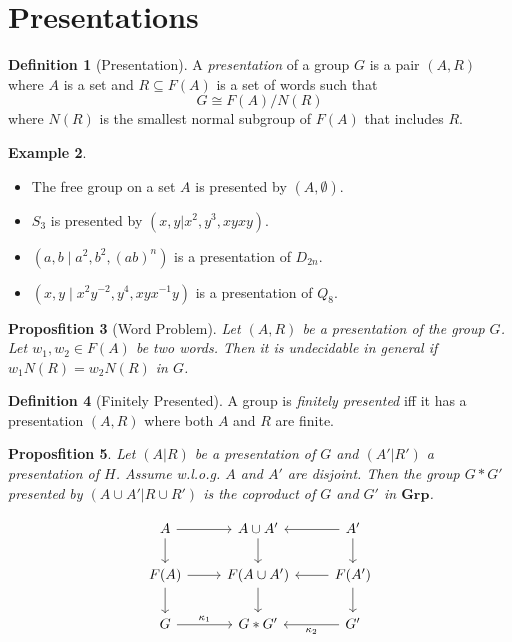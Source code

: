 \documentclass{book}
\newtheorem{prop}{Proposfition}[chapter]
\theoremstyle{definition}
\newtheorem{df}[prop]{Definition}
\newtheorem{ex}[prop]{Example}
\begin{document}
\section{Presentations}

\begin{df}[Presentation]
A \emph{presentation} of a group $G$ is a pair $(A,R)$ where $A$ is a set and $R \subseteq F(A)$ is a set of words such that
\[ G \cong F(A) / N(R) \]
where $N(R)$ is the smallest normal subgroup of $F(A)$ that includes $R$.
\end{df}

\begin{ex}
\begin{itemize}
\item The free group on a set $A$ is presented by $(A, \emptyset)$.
\item $S_3$ is presented by $(x,y|x^2,y^3,xyxy)$.
\item 
$(a,b \mid a^2, b^2, (ab)^n)$ is a presentation of $D_{2n}$.
\item $(x,y \mid x^2 y^{-2}, y^4, xyx^{-1}y)$ is a presentation of $Q_8$.
\end{itemize}
\end{ex}

\begin{prop}[Word Problem]
Let $(A,R)$ be a presentation of the group $G$. Let $w_1, w_2 \in F(A)$ be two words. Then it is undecidable in general if $w_1N(R) = w_2N(R)$ in $G$.
\end{prop}

\begin{df}[Finitely Presented]
A group is \emph{finitely presented} iff it has a presentation $(A,R)$ where both $A$ and $R$ are finite.
\end{df}

\begin{prop}
Let $(A|R)$ be a presentation of $G$ and $(A'|R')$ a presentation of $H$. Assume w.l.o.g. $A$ and $A'$ are disjoint. Then the group $G * G'$ presented by $(A \cup A' | R \cup R')$ is the coproduct of $G$ and $G'$ in $\mathbf{Grp}$.
\end{prop}

\[ \begin{tikzcd}
A \arrow[d] \arrow[r] & A \cup A' \arrow[d] & A' \arrow[l] \arrow[d] \\
 F(A) \arrow[d] \arrow[r] & F(A \cup A') \arrow[d] & F(A') \arrow[l] \arrow[d] \\
G \arrow[r, "\kappa_1"] & G * G' & G' \arrow[l, "\kappa_2"]
\end{tikzcd} \]
\end{document}
